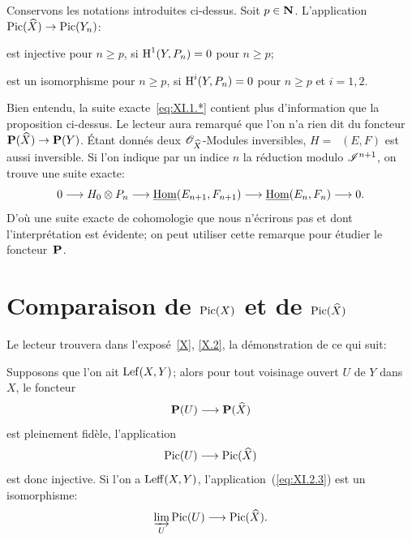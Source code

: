 \begin{proposition} \label{XI.1.1} Conservons les notations introduites ci-dessus. Soit $p\in\mathbf{N}$. L'application $\Pic(\hat X)\to \Pic(Y_n)$:
\begin{enumeratei}
\item
est injective pour $n\geq p$, si $\operatorname{H}^1(Y, P_n)=0$ pour $n\geq p$;
\item
est un isomorphisme pour $n\geq p$, si $\operatorname{H}^i(Y, P_n)=0$ pour $n\geq p$ et $i=1, 2$.
\end{enumeratei}
\end{proposition}

Bien entendu, la suite exacte~\eqref{eq:XI.1.*} contient plus d'information que la proposition ci-dessus. Le lecteur aura remarqu\'e que l'on n'a rien dit du foncteur $\PP(\hat X)\to\PP(Y)$. \'Etant donn\'es deux ${\mathscr O}_{\widehat X}$-Modules inversibles, $H=\mathop{\underline{\mathrm{Hom}}}\nolimits(E, F)$ est aussi inversible. Si l'on indique par un indice $n$ la r\'eduction modulo ${\mathscr I}^{n+1}$, on trouve une suite exacte:
\[
0\to H_0\otimes P_n \to \mathop{\underline{\mathrm{Hom}}}\nolimits(E_{n+1}, F_{n+1}) \to \mathop{\underline{\mathrm{Hom}}}\nolimits(E_n, F_n)\to 0{\quoi}.
\]
D'o\`u une suite exacte de cohomologie que nous n'\'ecrirons pas et dont l'interpr\'etation est \'evidente; on peut utiliser cette remarque pour \'etudier le foncteur~${\mathbf P}$.

\section{Comparaison de $\operatorname{Pic}(X)$ et de $\operatorname{Pic}(\widehat X)$} \label{XI.2}

Le lecteur trouvera dans l'expos\'e~\ref{X}, \numero \ref{X.2}, la d\'emonstration de ce qui suit:

\begin{proposition} \label{XI.2.1} Supposons que l'on ait $\operatorname{Lef}(X, Y)$; alors pour tout voisinage ouvert $U$ de $Y$ dans $X$, le foncteur
\begin{equation} \label{eq:XI.2.1} \PP(U)\to\PP(\hat X)
\end{equation}
est pleinement fid\`ele, l'application
\begin{equation} \label{eq:XI.2.2} \Pic(U)\to\Pic(\hat X)
\end{equation}
est donc injective. Si l'on a $\operatorname{Leff}(X, Y)$, l'application~(\ref{eq:XI.2.3}) est un isomorphisme:
\begin{equation} \label{eq:XI.2.3}
\varinjlim_U\Pic(U)\to\Pic(\hat X){\quoi}.
\end{equation}
\end{proposition}

